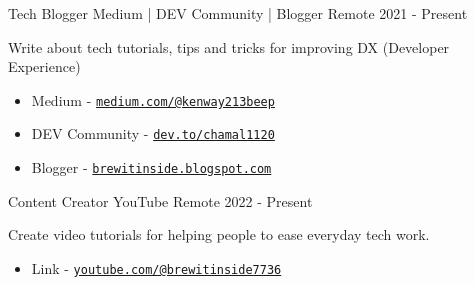 

\begin{cventries}

  \cventry
    {Tech Blogger} %
    {Medium | DEV Community | Blogger} %
    {Remote} %
    {2021 - Present} %
    {
      \begin{cvitems} %
        \item {Write about tech tutorials, tips and tricks for improving DX (Developer Experience)}
        \begin{itemize}
            \item Medium - \href{https://medium.com/@kenway213beep}{\nolinkurl{medium.com/@kenway213beep}}
            \item DEV Community - \href{https://dev.to/chamal1120}{\nolinkurl{dev.to/chamal1120}}
            \item Blogger - \href{https://brewitinside.blogspot.com}{\nolinkurl{brewitinside.blogspot.com}}
        \end{itemize}
      \end{cvitems}
    }
    
  \cventry
    {Content Creator} %
    {YouTube} %
    {Remote} %
    {2022 - Present} %
    {
      \begin{cvitems} %
        \item {Create video tutorials for helping people to ease everyday tech work.}
        \begin{itemize}
            \item Link - \href{https://www.youtube.com/@brewitinside7736}{\nolinkurl{youtube.com/@brewitinside7736}}
        \end{itemize}
      \end{cvitems}
    }

\end{cventries}
